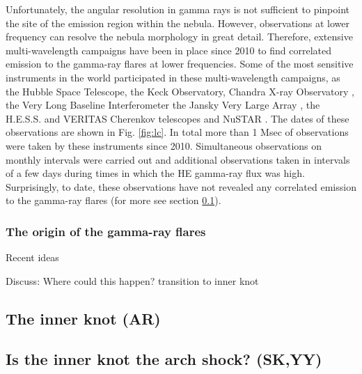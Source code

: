 Unfortunately, the angular resolution in gamma rays is not sufficient to pinpoint the site of the emission region within the nebula. However, observations at lower frequency can resolve the nebula morphology in great detail. Therefore, extensive multi-wavelength campaigns have been in place since 2010 to find correlated emission to the gamma-ray flares at lower frequencies. Some of the most sensitive instruments in the world participated in these multi-wavelength campaigns, as the Hubble Space Telescope, the Keck Observatory, Chandra X-ray Observatory \citep{Weisskopf2013,rudy2015}, the Very Long Baseline Interferometer \citep{Lobanov2011}  the Jansky Very Large Array \citep{Bietenholz2014}, the H.E.S.S. and VERITAS Cherenkov telescopes \citep{Abramowski2014,Aliu2014} and NuSTAR \citep{Madsen2015}. The dates of these observations are shown in Fig. \ref{fig:lc}. In total more than 1 Msec of observations were taken by these  instruments since 2010. Simultaneous observations on monthly intervals were carried out and additional observations taken in intervals of a few days during times in which the HE gamma-ray flux was high. Surprisingly, to date, these observations have not revealed any correlated emission to the gamma-ray flares (for more see section \ref{sec:knot}). 

\subsubsection{The origin of the gamma-ray flares}

Recent ideas  \cite{2016arXiv160403179Y}\cite{2015arXiv151205426Z}\cite{2016arXiv160304850N}\cite{2016arXiv160305731L}

Discuss: Where could this happen? transition to inner knot

\subsection{The inner knot   (AR)}
\label{sec:knot}
\subsection{Is the inner knot the arch shock?                                      (SK,YY)}
